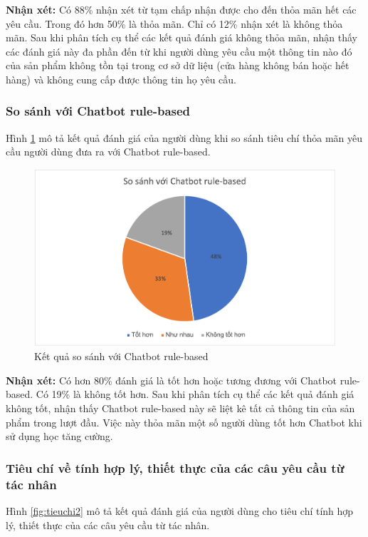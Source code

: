 \textbf{Nhận xét:}
Có 88\% nhận xét từ tạm chấp nhận được cho đến thỏa mãn hết các yêu cầu. Trong đó hơn 50\% là thỏa mãn. Chỉ có 12\% nhận xét là không thỏa mãn. Sau khi phân tích cụ thể các kết quả đánh giá không thỏa mãn, nhận thấy các đánh giá này đa phần đến từ khi người dùng yêu cầu một thông tin nào đó của sản phẩm không tồn tại trong cơ sở dữ liệu (cửa hàng không bán hoặc hết hàng) và không cung cấp được thông tin họ yêu cầu.

\subsubsection{So sánh với Chatbot rule-based}
Hình \ref{fig:tieuchi12} mô tả kết quả đánh giá của người dùng khi so sánh tiêu chí thỏa mãn yêu cầu người dùng đưa ra với Chatbot rule-based.

\begin{center}
    \begin{figure}[ht!]
        \begin{center}
         \includegraphics[scale=0.91]{chapter7/img/tieuchi1_2.png}
        \end{center}
        \caption{Kết quả so sánh với Chatbot rule-based}
        \label{fig:tieuchi12}
    \end{figure}
\end{center}

\textbf{Nhận xét:}
Có hơn 80\% đánh giá là tốt hơn hoặc tương đương với Chatbot rule-based. Có 19\% là không tốt hơn. Sau khi phân tích cụ thể các kết quả đánh giá không tốt, nhận thấy Chatbot rule-based này sẽ liệt kê tất cả thông tin của sản phẩm trong lượt đầu. Việc này thỏa mãn một số người dùng tốt hơn Chatbot khi sử dụng học tăng cường.

\subsubsection{Tiêu chí về tính hợp lý, thiết thực của các câu yêu cầu từ tác nhân}
Hình \ref{fig:tieuchi2} mô tả kết quả đánh giá của người dùng cho tiêu chí tính hợp lý, thiết thực của các câu yêu cầu từ tác nhân.

